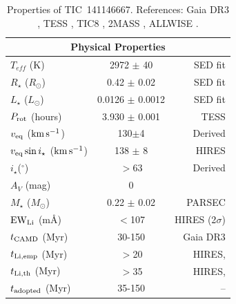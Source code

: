 \documentclass{nature3}
\newcommand{\kms}{\ensuremath{\rm km\,s^{-1}}}
\begin{document}
\begin{methods}
\begin{table}
\begin{tabular}{lcr}
    \hline
    \multicolumn{3}{c}{Physical Properties} \\
    \hline
    $T_{eff}$ (K) & 2972 $\pm$ 40 & \cite{Bouma2024} SED fit\\
    $R_\star$ ($R_{\odot}$) & 0.42 $\pm$ 0.02 & \cite{Bouma2024} SED fit \\
    $L_\star$ ($L_\odot$) & 0.0126 $\pm$ 0.0012 & \cite{Bouma2024} SED fit \\
    $P_{\rm rot}$ (hours) & 3.930 $\pm$ 0.001 & TESS \\ 
    $v_{\rm eq}$ (\kms)  &  130$\pm$4  & Derived \\
    $v_{\rm eq} \sin i_\star$ (\kms) & 138 $\pm$ 8 & HIRES \\
    $i_\star$($^\circ$) & $>$63 & Derived \\
    $A_V$ (mag) & 0 & \cite{Green2019} \\
    $M_\star$ ($M_{\odot}$)  & 0.22 $\pm$ 0.02  & PARSEC \cite{Chen2014}\\
    ${\rm EW}_{\rm Li}$ (m\AA) & $<$107 & HIRES (2$\sigma$)\\
    $t_{\rm CAMD}$ (Myr) & 30-150 &  Gaia DR3 \\
    $t_{\rm Li,emp}$ (Myr) & $>$20 &  HIRES, \cite{Jeffries2023} \\
    $t_{\rm Li,th}$ (Myr) & $>$35 &  HIRES, \cite{Feiden2016} \\
    $t_{\rm adopted}$ (Myr) & 35-150 &  -- \\
    \hline
    \end{tabular}
		\caption{Properties of TIC~141146667.  References:
    Gaia DR3 \cite{GaiaDR3}, TESS \cite{Ricker2015},
    TIC8 \cite{Stassun2019}, 2MASS \cite{Skrutskie2006}, ALLWISE
    \cite{Cutri2014}.}
    \label{tab:stparams}
\end{table}



\end{methods}
\end{document}
